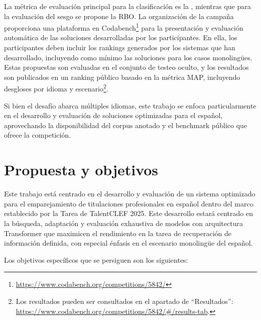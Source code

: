 La métrica de evaluación principal para la clasificación es la , mientras que para la evaluación del sesgo se propone la \gls{RBO}. La organización de la campaña proporciona una plataforma en Codabench\footnote{\url{https://www.codabench.org/competitions/5842/}} para la presentación y evaluación automática de las soluciones desarrolladas por los participantes. En ella, los participantes deben incluir los rankings generados por los sistemas que han desarrollado, incluyendo como mínimo las soluciones para los casos monolingües. Estas propuestas son evaluadas en el conjunto de testeo oculto, y los resultados son publicados en un ranking público basado en la métrica \gls{MAP}, incluyendo desgloses por idioma y escenario\footnote{Los resultados pueden ser consultados en el apartado de ``Resultados'': \url{https://www.codabench.org/competitions/5842/\#/results-tab}.}.

Si bien el desafío abarca múltiples idiomas, este trabajo se enfoca particularmente en el desarrollo y evaluación de soluciones optimizadas para el español, aprovechando la disponibilidad del corpus anotado y el benchmark público que ofrece la competición.


\section{Propuesta y objetivos}
\label{sec:PropuestaYObjetivos}

\noindent Este trabajo está centrado en el desarrollo y evaluación de un sistema optimizado para el emparejamiento de titulaciones profesionales en español dentro del marco establecido por la \gls{Tarea} de TalentCLEF 2025. Este desarrollo estará centrado en la búsqueda, adaptación y evaluación exhaustiva de modelos con arquitectura Transformer que maximicen el rendimiento en la tarea de recuperación de información definida, con especial énfasis en el escenario monolingüe del español.

Los objetivos específicos que se persiguen son los siguientes:

